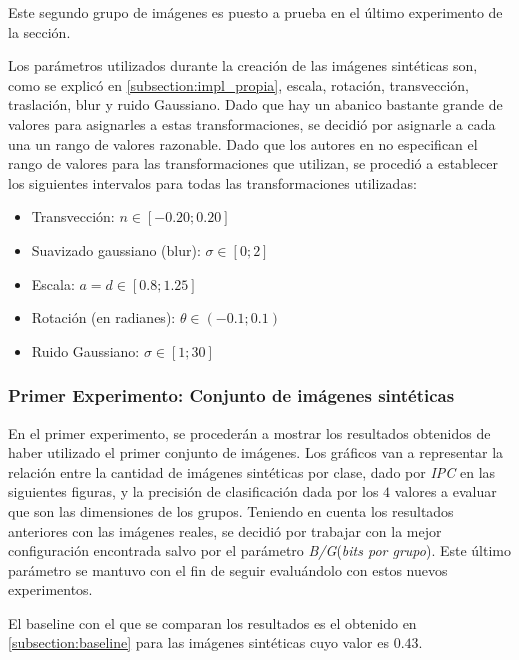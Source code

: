 	Este segundo grupo de imágenes es puesto a prueba en el último experimento de la sección.

	Los parámetros utilizados durante la creación de las imágenes sintéticas son, como se explicó en \ref{subsection:impl_propia}, escala, rotación, transvección, traslación, blur y ruido Gaussiano. Dado que hay un abanico bastante grande de valores para asignarles a estas transformaciones, se decidió por asignarle a cada una un rango de valores razonable. Dado que los autores en \cite{wang} no especifican el rango de valores para las transformaciones que utilizan, se procedió a establecer los siguientes intervalos para todas las transformaciones utilizadas:
	
	\begin{itemize}
		\item Transvección: $n \in [-0.20 ; 0.20]$
		\item Suavizado gaussiano (blur): $\sigma \in [0 ; 2]$
		\item Escala: $a=d \in [0.8; 1.25]$
		\item Rotación (en radianes): $\theta \in (-0.1; 0.1)$
		\item Ruido Gaussiano: $\sigma \in [1; 30]$
	\end{itemize}

\subsubsection{Primer Experimento: Conjunto de imágenes sintéticas}
\label{subsubsection:primer-experimento}

	En el primer experimento, se procederán a mostrar los resultados ob\-te\-ni\-dos de haber utilizado el primer conjunto de imágenes. Los gráficos van a re\-pre\-sen\-tar la relación entre la cantidad de imágenes sintéticas por clase, dado por \textit{IPC} en las siguientes figuras, y la precisión de clasificación dada por los $4$ valores a evaluar que son las dimensiones de los grupos. Teniendo en cuenta los resultados anteriores con las imágenes reales, se decidió por trabajar con la mejor configuración encontrada salvo por el parámetro \textit{B/G}(\textit{bits por grupo}). Este último parámetro se mantuvo con el fin de seguir evaluándolo con estos nuevos experimentos.
	
	El baseline con el que se comparan los resultados es el obtenido en \ref{subsection:baseline} para las imágenes sintéticas cuyo valor es $0.43$.

